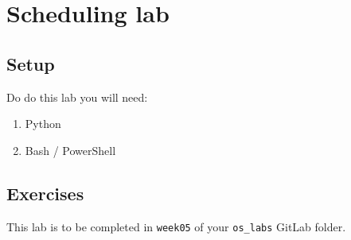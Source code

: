 \chapter{Scheduling lab}
\label{ch:scheduling-lab}

\section{Setup}

Do do this lab you will need:
\begin{enumerate}
\item Python
\item Bash / PowerShell
\end{enumerate}

\section{Exercises}

This lab is to be completed in \texttt{week05} of your \texttt{os\_labs} GitLab folder.

